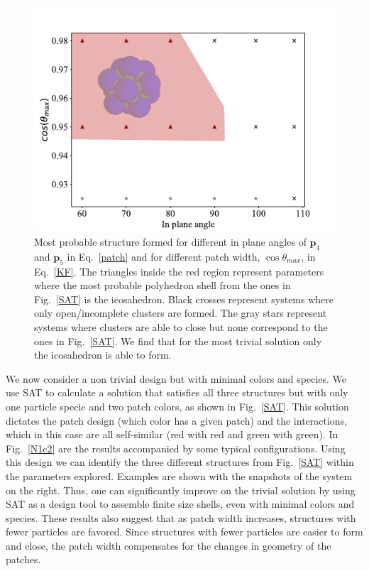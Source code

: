 \documentclass[a4paper, amsfonts, amssymb, amsmath, reprint, showkeys, nofootinbib, twoside]{revtex4-1}
\begin{document}
\begin{figure}[t]
	\includegraphics{fig2.pdf}
	\caption{\label{N1c1} Most probable structure formed for different in plane angles of $\textbf{p}_4$ and $\textbf{p}_5$ in Eq.~\ref{patch} and for different patch width, $\cos\theta_{max}$, in Eq.~\ref{KF}. The triangles inside the red region represent parameters where the most probable polyhedron shell from the ones in Fig.~\ref{SAT} is the icosahedron. Black crosses represent systems where only open/incomplete clusters are formed. The gray stars represent systems where clusters are able to close but none correspond to the ones in Fig.~\ref{SAT}. We find that for the most trivial solution only the icosahedron is able to form.}
\end{figure}

We now consider a non trivial design but with minimal colors and species. We use SAT to calculate a solution that satisfies all three structures but with only one particle specie and two patch colors, as shown in Fig.~\ref{SAT}. This solution dictates the patch design (which color has a given patch) and the interactions, which in this case are all self-similar (red with red and green with green). In Fig.~\ref{N1c2} are the results accompanied by some typical configurations. Using this design we can identify the three different structures from Fig.~\ref{SAT} within the parameters explored. Examples are shown with the snapshots of the system on the right. Thus, one can significantly improve on the trivial solution by using SAT as a design tool to assemble finite size shells, even with minimal colors and species. These results also suggest that as patch width increases, structures with fewer particles are favored. Since structures with fewer particles are easier to form and close, the patch width compensates for the changes in geometry of the patches.
\end{document}
